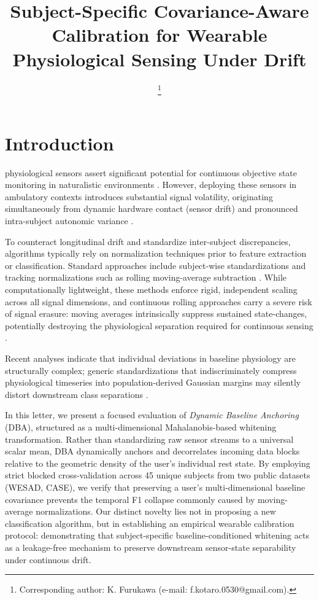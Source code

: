 \documentclass{IEEE_lsens}
\title{Subject-Specific Covariance-Aware Calibration for Wearable Physiological Sensing Under Drift}
\author{\IEEEauthorblockN{Kotaro Furukawa\IEEEauthorieeemembermark{1}, \textit{Student Member, IEEE}}
\IEEEauthorblockA{\IEEEauthorrefmark{1}Frontier School of Transdisciplinary Sciences, Kanazawa University, Ishikawa, Japan}%
\thanks{Corresponding author: K. Furukawa (e-mail: f.kotaro.0530@gmail.com).}}
\begin{document}
\maketitle

\section{Introduction}

 physiological sensors assert significant potential for continuous objective state monitoring in naturalistic environments \cite{picard1997}. However, deploying these sensors in ambulatory contexts introduces substantial signal volatility, originating simultaneously from dynamic hardware contact (sensor drift) and pronounced intra-subject autonomic variance \cite{wilhelm2006, picard2001}. 

To counteract longitudinal drift and standardize inter-subject discrepancies, algorithms typically rely on normalization techniques prior to feature extraction or classification. Standard approaches include subject-wise standardizations \cite{schmidt2018wesad, bota2019} and tracking normalizations such as rolling moving-average subtraction \cite{calvo2010}. While computationally lightweight, these methods enforce rigid, independent scaling across all signal dimensions, and continuous rolling approaches carry a severe risk of signal erasure: moving averages intrinsically suppress sustained state-changes, potentially destroying the physiological separation required for continuous sensing \cite{bota2019}.

Recent analyses indicate that individual deviations in baseline physiology are structurally complex; generic standardizations that indiscriminately compress physiological timeseries into population-derived Gaussian margins may silently distort downstream class separations \cite{calvo2010, martinez2017}. 

In this letter, we present a focused evaluation of \textit{Dynamic Baseline Anchoring} (DBA), structured as a multi-dimensional Mahalanobis-based whitening transformation. Rather than standardizing raw sensor streams to a universal scalar mean, DBA dynamically anchors and decorrelates incoming data blocks relative to the geometric density of the user's individual rest state. By employing strict blocked cross-validation across 45 unique subjects from two public datasets (WESAD, CASE), we verify that preserving a user's multi-dimensional baseline covariance prevents the temporal F1 collapse commonly caused by moving-average normalizations. Our distinct novelty lies not in proposing a new classification algorithm, but in establishing an empirical wearable calibration protocol: demonstrating that subject-specific baseline-conditioned whitening acts as a leakage-free mechanism to preserve downstream sensor-state separability under continuous drift.
\end{document}
